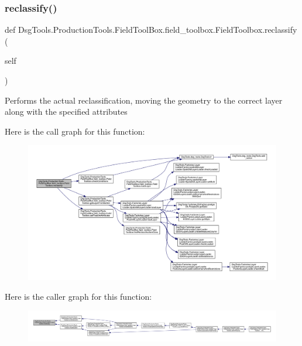 \subsubsection{\texorpdfstring{reclassify()}{reclassify()}}
{\footnotesize\ttfamily def Dsg\+Tools.\+Production\+Tools.\+Field\+Tool\+Box.\+field\+\_\+toolbox.\+Field\+Toolbox.\+reclassify (\begin{DoxyParamCaption}\item[{}]{self }\end{DoxyParamCaption})}

\begin{DoxyVerb}Performs the actual reclassification, moving the geometry to the correct layer along with the specified attributes
\end{DoxyVerb}
 Here is the call graph for this function\+:
\nopagebreak
\begin{figure}[H]
\begin{center}
\leavevmode
\includegraphics[width=350pt]{class_dsg_tools_1_1_production_tools_1_1_field_tool_box_1_1field__toolbox_1_1_field_toolbox_a55f4b1700bd0416f59d955f57f1f9744_cgraph}
\end{center}
\end{figure}
Here is the caller graph for this function\+:
\nopagebreak
\begin{figure}[H]
\begin{center}
\leavevmode
\includegraphics[width=350pt]{class_dsg_tools_1_1_production_tools_1_1_field_tool_box_1_1field__toolbox_1_1_field_toolbox_a55f4b1700bd0416f59d955f57f1f9744_icgraph}
\end{center}
\end{figure}
\mbox{\label{class_dsg_tools_1_1_production_tools_1_1_field_tool_box_1_1field__toolbox_1_1_field_toolbox_a9a87b00d3a76bc0c7bce6f0c27b508df}} 
